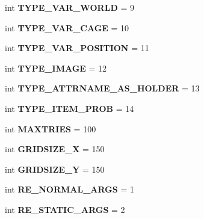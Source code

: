 \begin{DoxyCompactItemize}
\item 
\hypertarget{namespaceconstants_a468366a9ac64bfba2548f347d64b6502}{}int {\bfseries T\+Y\+P\+E\+\_\+\+V\+A\+R\+\_\+\+W\+O\+R\+L\+D} = 9\label{namespaceconstants_a468366a9ac64bfba2548f347d64b6502}

\item 
\hypertarget{namespaceconstants_ac7c84505d0b77010a9080d16270032ee}{}int {\bfseries T\+Y\+P\+E\+\_\+\+V\+A\+R\+\_\+\+C\+A\+G\+E} = 10\label{namespaceconstants_ac7c84505d0b77010a9080d16270032ee}

\item 
\hypertarget{namespaceconstants_a9b0f96facd33f07128dbe1b8dccaa4f2}{}int {\bfseries T\+Y\+P\+E\+\_\+\+V\+A\+R\+\_\+\+P\+O\+S\+I\+T\+I\+O\+N} = 11\label{namespaceconstants_a9b0f96facd33f07128dbe1b8dccaa4f2}

\item 
\hypertarget{namespaceconstants_a5d0a1587dca825743b8762142dbdda01}{}int {\bfseries T\+Y\+P\+E\+\_\+\+I\+M\+A\+G\+E} = 12\label{namespaceconstants_a5d0a1587dca825743b8762142dbdda01}

\item 
\hypertarget{namespaceconstants_ae3465f3a0e532e65606b27e40be0cbbb}{}int {\bfseries T\+Y\+P\+E\+\_\+\+A\+T\+T\+R\+N\+A\+M\+E\+\_\+\+A\+S\+\_\+\+H\+O\+L\+D\+E\+R} = 13\label{namespaceconstants_ae3465f3a0e532e65606b27e40be0cbbb}

\item 
\hypertarget{namespaceconstants_a665fc3f24f82f5049ccb007d61fda9b4}{}int {\bfseries T\+Y\+P\+E\+\_\+\+I\+T\+E\+M\+\_\+\+P\+R\+O\+B} = 14\label{namespaceconstants_a665fc3f24f82f5049ccb007d61fda9b4}

\item 
\hypertarget{namespaceconstants_a1dc8e7ed710dde3bc77e165417976351}{}int {\bfseries M\+A\+X\+T\+R\+I\+E\+S} = 100\label{namespaceconstants_a1dc8e7ed710dde3bc77e165417976351}

\item 
\hypertarget{namespaceconstants_a25213323d4d0c26ffc418053d65a7ed2}{}int {\bfseries G\+R\+I\+D\+S\+I\+Z\+E\+\_\+\+X} = 150\label{namespaceconstants_a25213323d4d0c26ffc418053d65a7ed2}

\item 
\hypertarget{namespaceconstants_ac0b902b2948d3665c995d9e0584babe2}{}int {\bfseries G\+R\+I\+D\+S\+I\+Z\+E\+\_\+\+Y} = 150\label{namespaceconstants_ac0b902b2948d3665c995d9e0584babe2}

\item 
\hypertarget{namespaceconstants_aa5e267cb7a87752bfa4b90174e0e2d76}{}int {\bfseries R\+E\+\_\+\+N\+O\+R\+M\+A\+L\+\_\+\+A\+R\+G\+S} = 1\label{namespaceconstants_aa5e267cb7a87752bfa4b90174e0e2d76}

\item 
\hypertarget{namespaceconstants_a10cf60e643872d9d83689d52a43d3037}{}int {\bfseries R\+E\+\_\+\+S\+T\+A\+T\+I\+C\+\_\+\+A\+R\+G\+S} = 2\label{namespaceconstants_a10cf60e643872d9d83689d52a43d3037}

\end{DoxyCompactItemize}


